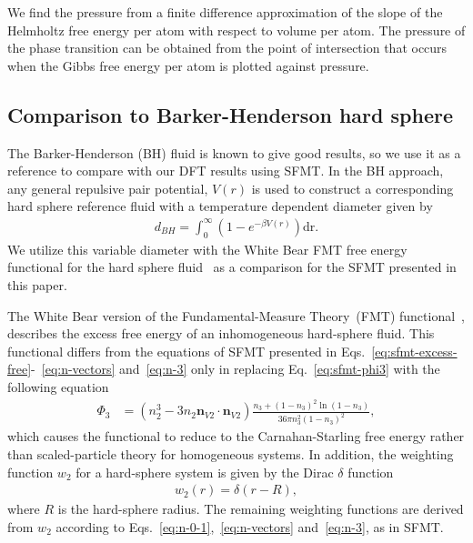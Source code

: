 \documentclass[letterpaper,twocolumn,amsmath,amssymb,prb]{revtex4-1}
\begin{document}
We find the pressure from a finite difference approximation of
the slope of the Helmholtz 
free energy per atom with respect to volume per atom.
The pressure of the phase transition can be obtained from the point of intersection
that occurs when the Gibbs free energy per atom %
is plotted against pressure. 

\subsection{Comparison to Barker-Henderson hard sphere}

The Barker-Henderson (BH) fluid is known to give good results, so we use it 
as a reference to compare with our DFT results using SFMT. 
In the BH approach, any general
repulsive pair potential, $V(r)$ is used to construct a corresponding hard
sphere reference fluid with a temperature dependent diameter given by~\cite{barker1967perturbation}
\begin{align}
  d_{BH} = \int_0^{\infty}\left( 1 - e^{-\beta V(r)} \right)\mathrm{dr}.
  \label{eq:bh-diameter}
\end{align}
We utilize this variable diameter with the White Bear FMT free energy
functional for the hard sphere fluid~\cite{roth2002whitebear} as a
comparison for the SFMT presented in this paper.

The White Bear version of the Fundamental-Measure Theory~(FMT)
functional~\cite{roth2002whitebear}, describes the excess free energy
of an inhomogeneous hard-sphere fluid.  This functional differs
from the equations of SFMT presented in
Eqs.~\ref{eq:sfmt-excess-free}-~\ref{eq:n-vectors} and~\ref{eq:n-3} only in replacing
Eq.~\ref{eq:sfmt-phi3} with the following equation
\begin{align}
\Phi_3 &= (n_2^3 - 3 n_2 \mathbf{n}_{V2} \cdot \mathbf{n}_{V2}) \frac{
  n_3 + (1-n_3)^2 \ln(1-n_3)
}{
  36\pi n_3^2\left( 1 - n_3 \right)^2
} , 
\end{align}
which causes the functional to reduce to the Carnahan-Starling free
energy rather than scaled-particle theory for homogeneous systems. In
addition, the weighting function $w_2$ for a hard-sphere system is
given by the Dirac $\delta$ function
\begin{align}
  w_2(r) = \delta(r - R),
\end{align}
where $R$ is the hard-sphere radius. The remaining weighting
functions are derived from $w_2$ according to
Eqs.~\ref{eq:n-0-1},~\ref{eq:n-vectors} and~\ref{eq:n-3}, as in SFMT.
\end{document}
